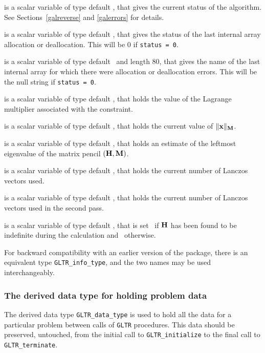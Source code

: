 \documentclass{galahad}
\newcommand{\packagename}{GL\-TR}
\begin{document}
\begin{description}
 is a scalar variable of type default \integer, that gives the
current status of the algorithm. See Sections~\ref{galreverse} and
\ref{galerrors} for details.

 is a scalar variable of type default \integer,
that gives the status of the last internal array allocation
or deallocation. This will be 0 if {\tt status = 0}.

 is a scalar variable of type default \character\
and length 80, that  gives the name of the last internal array
for which there were allocation or deallocation errors.
This will be the null string if {\tt status = 0}.

 is a scalar variable of type default
\realdp, that holds the
value of the Lagrange multiplier associated with the constraint.

 is a scalar variable of type default
\realdp,
that holds the current
value of $\|{\mathbf{x}}\|_{{\mathbf{M}}} $.

 is a scalar variable of type default
\realdp, that holds an estimate of the leftmost eigenvalue of the
matrix pencil $({\mathbf{H}},{\mathbf{M}})$.

 is a scalar variable of type default \integer, that holds the
current number of Lanczos vectors used.

 is a scalar variable of type default \integer, that holds the
current number of Lanczos vectors used in the second pass.

 is a scalar variable of type default \logical, that
is set \true\ if ${\mathbf{H}}$ has been found to be indefinite during the calculation
and \false\ otherwise.
\end{description}

\noindent
For backward compatibility with an earlier version of the package, there
is an equivalent type {\tt \packagename\_info\_type}, and the two names
may be used interchangeably.


\subsubsection{The derived data type for holding problem data}\label{typedata}
The derived data type
{\tt \packagename\_data\_type}
is used to hold all the data for a particular problem between calls of
{\tt \packagename} procedures.
This data should be preserved, untouched, from the initial call to
{\tt \packagename\_initialize}
to the final call to
{\tt \packagename\_terminate}.
\end{document}
